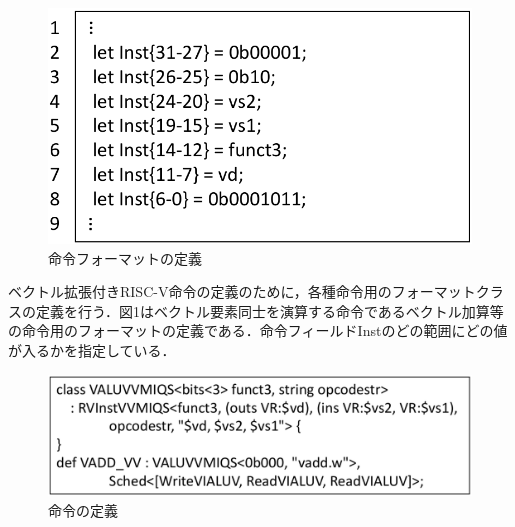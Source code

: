 ﻿\documentclass[a4j]{jarticle}
\begin{document}
\begin{figure}[b]
    \centering
    \includegraphics[scale=0.5]{RVInstVVMIQS_min.pdf}
    \caption{命令フォーマットの定義}
    \label{fig:Instruciton_format}
\end{figure}


ベクトル拡張付きRISC-V命令の定義のために，各種命令用のフォーマットクラスの定義を行う．図1はベクトル要素同士を演算する命令であるベクトル加算等の命令用のフォーマットの定義である．命令フィールドInstのどの範囲にどの値が入るかを指定している．

\begin{figure}[t]
    \centering
    \includegraphics[scale=0.5]{Instruction_min.pdf}
    \caption{命令の定義}
    \label{fig:Instruciton}
\end{figure}

\end{document}
